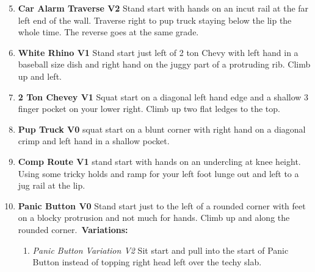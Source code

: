\begin{enumerate}[]
	\setcounter{enumi}{4}
	\item\label{rt:Car Alarm Traverse} \colorbox{green!20}{\textbf{Car Alarm Traverse V2    } }
	\newline Stand start with hands on an incut rail at the far left end of the wall. Traverse right to pup truck staying below the lip the whole time. The reverse goes at the same grade.\
	\setcounter{enumi}{5}
	\item\label{rt:White Rhino} \colorbox{green!20}{\textbf{White Rhino V1   } }
	\newline Stand start just left of 2 ton Chevy with left hand in a baseball size dish and right hand on the juggy part of a protruding rib. Climb up and left.\
	\setcounter{enumi}{6}
	\item\label{rt:2 Ton Chevey} \colorbox{green!20}{\textbf{2 Ton Chevey V1    } }
	\newline Squat start on a diagonal left hand edge and a shallow 3 finger pocket on your lower right. Climb up two flat ledges to the top.\
	\setcounter{enumi}{7}
	\item\label{rt:Pup Truck} \colorbox{green!20}{\textbf{Pup Truck V0    } }
	\newline squat start on a blunt corner with right hand on a diagonal crimp and left hand in a shallow pocket.\
	\setcounter{enumi}{8}
	\item\label{rt:Comp Route} \colorbox{green!20}{\textbf{Comp Route V1 \ding{72} \ding{72}  } }
	\newline stand start with hands on an undercling at knee height. Using some tricky holds and ramp for your left foot lunge out and left to a jug rail at the lip.\
	\setcounter{enumi}{9}
	\item\label{rt:Panic Button} \colorbox{green!20}{\textbf{Panic Button V0 \ding{72}  } }
	\newline Stand start just to the left of a rounded corner with feet on a blocky protrusion and not much for hands. Climb up and along the rounded corner.\
	\newline \textbf{Variations:}
	\begin{enumerate}
		\item\label{vr:Panic Button Variation} \colorbox{green!20}{\emph{Panic Button Variation V2 \ding{72} \ding{72}  }  }
		\newline Sit start and pull into the start of Panic Button instead of topping right head left over the techy slab.\
	\end{enumerate}
\end{enumerate}
